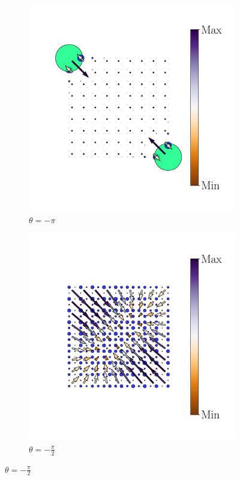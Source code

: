 \begin{figure}[h!]
     \centering
    \captionsetup[sub]{font=small}
     \begin{minipage}[h!]{1.1\textwidth}
         \begin{subfigure}[b!]{0.2 \textwidth}
             \caption{$\theta = -\pi$}
             \includegraphics[width=\textwidth]{Imagenes/Resultados_pump_Cuadrado/xy/hoti_pomp_xy_pos1.pdf}
         \end{subfigure}\hspace*{-0.5em}
          \begin{subfigure}[b!]{0.2 \textwidth}
             \caption*{$\theta = -\frac{\pi}{2}$}
             \includegraphics[width=\textwidth]{Imagenes/Resultados_pump_Cuadrado/xy/hoti_pomp_xy_pos2.pdf}

\end{subfigure}
\end{minipage}
\end{figure}
